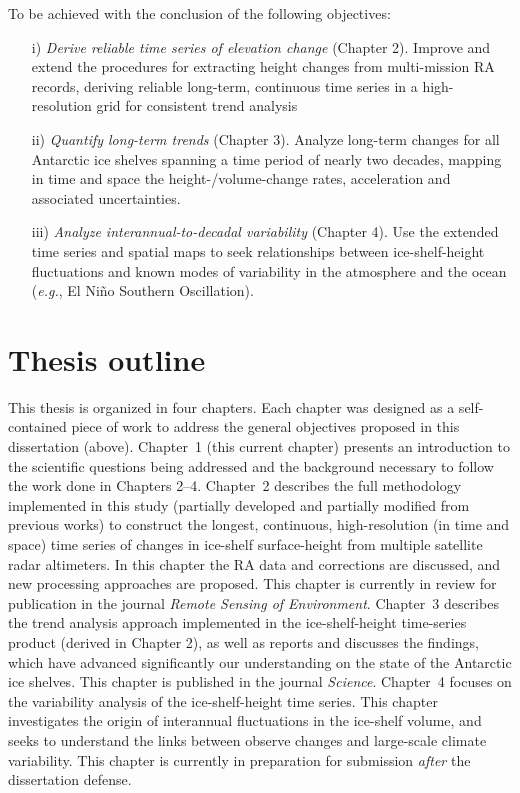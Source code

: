 To be achieved with the conclusion of the following objectives:

\begin{enumerate}
  \item[i)] {\it Derive reliable time series of elevation change} ({\sc Chapter 2}). Improve and
  extend the procedures for extracting height changes from multi-mission RA
  records, deriving reliable long-term, continuous time series in a
  high-resolution grid for consistent trend analysis
  \item[ii)] {\it Quantify long-term trends} ({\sc Chapter 3}). Analyze long-term changes for
  all Antarctic ice shelves spanning a time period of nearly two decades,
  mapping in time and space the height-/volume-change rates, acceleration
  and associated uncertainties.
  \item[iii)] {\it Analyze interannual-to-decadal variability} ({\sc Chapter 4}). Use the
  extended time series and spatial maps to seek relationships between
  ice-shelf-height fluctuations and known modes of variability in the
  atmosphere and the ocean ({\it e.g.}, El Ni\~{n}o Southern Oscillation).
\end{enumerate}

\section*{Thesis outline}

This thesis is organized in four chapters. Each chapter was designed as a self-contained piece of work to address the general objectives proposed in this dissertation (above). {\sc Chapter~1} (this current chapter) presents an introduction to the scientific questions being addressed and the background necessary to follow the work done in Chapters 2--4. {\sc Chapter~2} describes the full methodology implemented in this study (partially developed and partially modified from previous works) to construct the longest, continuous, high-resolution (in time and space) time series of changes in ice-shelf surface-height from multiple satellite radar altimeters. In this chapter the RA data and corrections are discussed, and new processing approaches are proposed. This chapter is currently in review for publication in the journal {\it Remote Sensing of Environment}. {\sc Chapter~3} describes the trend analysis approach implemented in the ice-shelf-height time-series product (derived in Chapter 2), as well as reports and discusses the findings, which have advanced significantly our understanding on the state of the Antarctic ice shelves. This chapter is published in the journal {\it Science}. {\sc Chapter~4} focuses on the variability analysis of the ice-shelf-height time series. This chapter investigates the origin of interannual fluctuations in the ice-shelf volume, and seeks to understand the links between observe changes and large-scale climate variability. This chapter is currently in preparation for submission \emph{after} the dissertation defense.


